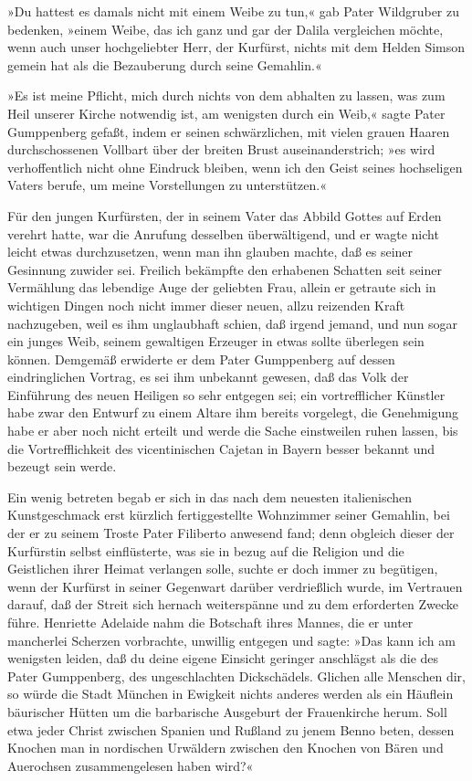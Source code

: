 »Du hattest es damals nicht mit einem Weibe zu tun,« gab Pater
Wildgruber zu bedenken, »einem Weibe, das ich ganz und gar der
Dalila vergleichen möchte, wenn auch unser hochgeliebter Herr, der
Kurfürst, nichts mit dem Helden Simson gemein hat als die
Bezauberung durch seine Gemahlin.«

»Es ist meine Pflicht, mich durch nichts von dem abhalten zu
lassen, was zum Heil unserer Kirche notwendig ist, am wenigsten
durch ein Weib,« sagte Pater Gumppenberg gefaßt, indem er seinen
schwärzlichen, mit vielen grauen Haaren durchschossenen Vollbart
über der breiten Brust auseinanderstrich; »es wird verhoffentlich
nicht ohne Eindruck bleiben, wenn ich den Geist seines hochseligen
Vaters berufe, um meine Vorstellungen zu unterstützen.«

Für den jungen Kurfürsten, der in seinem Vater das Abbild Gottes
auf Erden verehrt hatte, war die Anrufung desselben überwältigend,
und er wagte nicht leicht etwas durchzusetzen, wenn man ihn glauben
machte, daß es seiner Gesinnung zuwider sei. Freilich bekämpfte den
erhabenen Schatten seit seiner Vermählung das lebendige Auge der
geliebten Frau, allein er getraute sich in wichtigen Dingen noch
nicht immer dieser neuen, allzu reizenden Kraft nachzugeben, weil
es ihm unglaubhaft schien, daß irgend jemand, und nun sogar ein
junges Weib, seinem gewaltigen Erzeuger in etwas sollte überlegen
sein können. Demgemäß erwiderte er dem Pater Gumppenberg auf dessen
eindringlichen Vortrag, es sei ihm unbekannt gewesen, daß das Volk
der Einführung des neuen Heiligen so sehr entgegen sei; ein
vortrefflicher Künstler habe zwar den Entwurf zu einem Altare ihm
bereits vorgelegt, die Genehmigung habe er aber noch\pagenum{[99]}
nicht erteilt und werde die Sache einstweilen ruhen lassen, bis die
Vortrefflichkeit des vicentinischen Cajetan in Bayern besser
bekannt und bezeugt sein werde.

Ein wenig betreten begab er sich in das nach dem neuesten
italienischen Kunstgeschmack erst kürzlich fertiggestellte
Wohnzimmer seiner Gemahlin, bei der er zu seinem Troste Pater
Filiberto anwesend fand; denn obgleich dieser der Kurfürstin selbst
einflüsterte, was sie in bezug auf die Religion und die Geistlichen
ihrer Heimat verlangen solle, suchte er doch immer zu begütigen,
wenn der Kurfürst in seiner Gegenwart darüber verdrießlich wurde,
im Vertrauen darauf, daß der Streit sich hernach weiterspänne und
zu dem erforderten Zwecke führe. Henriette Adelaide nahm die
Botschaft ihres Mannes, die er unter mancherlei Scherzen
vorbrachte, unwillig entgegen und sagte: »Das kann ich am wenigsten
leiden, daß du deine eigene Einsicht geringer anschlägst als die
des Pater Gumppenberg, des ungeschlachten Dickschädels. Glichen
alle Menschen dir, so würde die Stadt München in Ewigkeit nichts
anderes werden als ein Häuflein bäurischer Hütten um die
barbarische Ausgeburt der Frauenkirche herum. Soll etwa jeder
Christ zwischen Spanien und Rußland zu jenem Benno beten, dessen
Knochen man in nordischen Urwäldern zwischen den Knochen von Bären
und Auerochsen zusammengelesen haben wird?«

